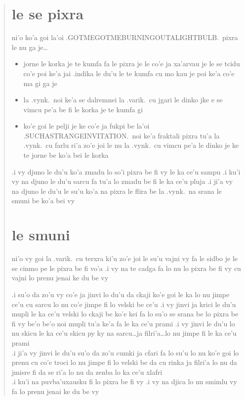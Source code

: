 \documentclass{report}
\begin{document}
\begin{quote}
	\section{le se pixra}
	ni'o ko'a goi la'oi .GOTMEGOTMEBURNINGOUTALIGHTBULB.\ pixra le nu ga je\ldots
	\begin{itemize}
		\item jorne le korka je te kumfa fa le pixra je le co'e ja xa'arvau je le se tcidu co'e poi ke'a jai .indika le du'u le te kumfa cu mo kau je poi ke'a co'e ma gi ga je
		\item la .vynk.\ noi ke'a se dalremnei la .varik.\ cu jgari le dinko jke e se vimcu pe'a be fi le korka je te kumfa gi
		\item ko'e goi le pelji je ke co'e ja fukpi be la'oi .SUCHASTRANGEINVITATION.\ noi ke'a fraktali pixra tu'a la .vynk.\ cu farlu ri'a zo'e joi le nu la .vynk.\ cu vimcu pe'a le dinko je ke te jorne be ko'a bei le korka
	\end{itemize}

	.i vy djuno le du'u ko'a zmadu lo so'i pixra be fi vy le ka ce'u sampu  .i ku'i vy na djuno le du'u sarcu fa tu'a lo zmadu be fi le ka ce'u pluja  .i ji'a vy na djuno le du'u le su'u ko'a na pixra le flira be la .vynk.\ na srana le smuni be ko'a bei vy

	\section{le smuni}
	ni'o vy goi la .varik.\ cu terxra ki'u zo'e joi le su'u vajni vy fa le sidbo je le se cinmo pe le pixra be fi vo'a  .i vy na te cadga fa lo nu lo pixra be fi vy cu vajni lo prenu jenai ke du be vy

	.i su'o da zo'u vy co'e ja jinvi lo du'u da ckaji ko'e goi le ka lo nu jimpe ce'u cu sarcu lo nu co'e jimpe fi lo velski be ce'u  .i vy jinvi ja krici le du'u mupli le ka ce'u velski lo ckaji be ko'e kei fa lo su'o se srana be lo pixra be fi vy be'o be'o noi mupli tu'a ke'a fa le ka ce'u prami  .i vy jinvi le du'u lo nu skicu le ka ce'u skicu py ky na sarcu\ldots ja filri'a\ldots lo nu jimpe fi le ka ce'u prami\\
	.i ji'a vy jinvi le du'u su'o da zo'u cumki ja cfari fa lo su'u lo nu ko'e goi lo prenu cu co'e troci lo nu jimpe fi lo velski be da cu rinka ja filri'a lo nu da jmisre fi da se ri'a lo nu da zenba lo ka ce'u xlafri\\
	.i ku'i na puvba'uxausku fi lo pixra be fi vy  .i vy na djica lo nu smimlu vy fa lo prenu jenai ke du be vy


\end{quote}
\end{document}
